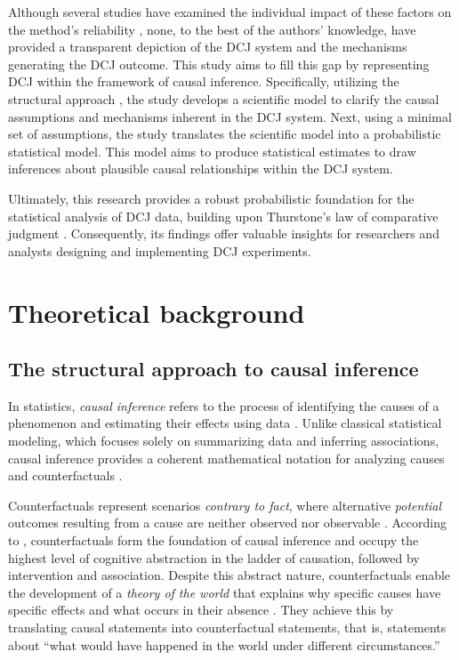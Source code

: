 \documentclass[
  authoryear,
  preprint,
  1p]{elsarticle}
\begin{document}
Although several studies have examined the individual impact of these
factors on the method's reliability
\citep{Bramley_2015, Pollitt_2012b, Bramley_et_al_2019, Verhavert_et_al_2019, Crompvoets_et_al_2022, vanDaal_et_al_2017, Gijsen_et_al_2021},
none, to the best of the authors' knowledge, have provided a transparent
depiction of the DCJ system and the mechanisms generating the DCJ
outcome. This study aims to fill this gap by representing DCJ within the
framework of causal inference. Specifically, utilizing the structural
approach \citep{Wright_1921, Pearl_2009, Pearl_et_al_2016}, the study
develops a scientific model to clarify the causal assumptions and
mechanisms inherent in the DCJ system. Next, using a minimal set of
assumptions, the study translates the scientific model into a
probabilistic statistical model. This model aims to produce statistical
estimates to draw inferences about plausible causal relationships within
the DCJ system.

Ultimately, this research provides a robust probabilistic foundation for
the statistical analysis of DCJ data, building upon Thurstone's law of
comparative judgment \citeyearpar{Thurstone_1927}. Consequently, its
findings offer valuable insights for researchers and analysts designing
and implementing DCJ experiments.

\section{Theoretical background}\label{sec-background}

\subsection{The structural approach to causal
inference}\label{sec-background-structural}

In statistics, \emph{causal inference} refers to the process of
identifying the causes of a phenomenon and estimating their effects
using data \citep{Shaughnessy_et_al_2010, Neal_2020}. Unlike classical
statistical modeling, which focuses solely on summarizing data and
inferring associations, causal inference provides a coherent
mathematical notation for analyzing causes and counterfactuals
\citep{Pearl_2009}.

Counterfactuals represent scenarios \emph{contrary to fact}, where
alternative \emph{potential} outcomes resulting from a cause are neither
observed nor observable \citep{Neal_2020, Counterfactual_2024}.
According to \citet{Pearl_et_al_2018}, counterfactuals form the
foundation of causal inference and occupy the highest level of cognitive
abstraction in the ladder of causation, followed by intervention and
association. Despite this abstract nature, counterfactuals enable the
development of a \emph{theory of the world} that explains why specific
causes have specific effects and what occurs in their absence
\citep{Pearl_et_al_2018}. They achieve this by translating causal
statements into counterfactual statements, that is, statements about
``what would have happened in the world under different circumstances.''
\end{document}

